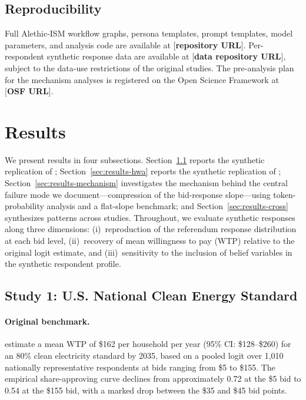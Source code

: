 \documentclass[12pt]{article}
\begin{document}
\subsection{Reproducibility}\label{sec:methods-reproducibility}

Full Alethic-ISM workflow graphs, persona templates, prompt templates, model parameters, and analysis code are available at [\textbf{repository URL}]. Per-respondent synthetic response data are available at [\textbf{data repository URL}], subject to the data-use restrictions of the original studies. The pre-analysis plan for the mechanism analyses is registered on the Open Science Framework at [\textbf{OSF URL}].



\section{Results}\label{sec:results}

We present results in four subsections. Section~\ref{sec:results-nces} reports the synthetic replication of \textcite{Aldy2012}; Section~\ref{sec:results-hwa} reports the synthetic replication of \textcite{Giguere2020}; Section~\ref{sec:results-mechanism} investigates the mechanism behind the central failure mode we document---compression of the bid-response slope---using token-probability analysis and a flat-slope benchmark; and Section~\ref{sec:results-cross} synthesizes patterns across studies. Throughout, we evaluate synthetic responses along three dimensions: (i)~reproduction of the referendum response distribution at each bid level, (ii)~recovery of mean willingness to pay (WTP) relative to the original logit estimate, and (iii)~sensitivity to the inclusion of belief variables in the synthetic respondent profile.

\subsection{Study 1: U.S. National Clean Energy Standard}\label{sec:results-nces}

\paragraph{Original benchmark.} \textcite{Aldy2012} estimate a mean WTP of \$162 per household per year (95\% CI: \$128--\$260) for an 80\% clean electricity standard by 2035, based on a pooled logit over 1{,}010 nationally representative respondents at bids ranging from \$5 to \$155. The empirical share-approving curve declines from approximately 0.72 at the \$5 bid to 0.54 at the \$155 bid, with a marked drop between the \$35 and \$45 bid points.
\end{document}
